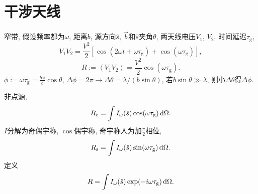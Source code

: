 \chapter{干涉天线}

窄带, 假设频率都为$\omega$, 距离$b$, 源方向$\hat{s}$, $\vec{b}$和$\hat{s}$夹角$\theta$, 两天线电压$V_1$, $V_2$, 时间延迟$\tau_\text{g}$,
\begin{equation}
    V_1V_2=\frac{V^2}{2}\left[\cos(2\omega t+\omega\tau_\text{g})+\cos(\omega\tau_\text{g})\right],
\end{equation}
\begin{equation}
    R:=\left\langle V_1V_2\right\rangle =\frac{V^2}{2}\cos(\omega\tau_\text{g}).
\end{equation}
$\phi:=\omega\tau_\text{g}=\frac{b\omega}{c}\cos\theta$, $\Delta\phi=2\pi\to\Delta\theta=\lambda/(b\sin\theta)$, 若$b\sin\theta\gg\lambda$, 则小$\Delta\theta$得$\Delta\phi$.

非点源,
\begin{equation}
    R_\text{c}=\int I_\omega(\hat{s})\cos(\omega\tau_\text{g})\,\mathrm{d}\Omega.
\end{equation}
$I$分解为奇偶宇称, $\cos$偶宇称, 奇宇称人为加$\frac{\pi}{2}$相位,
\begin{equation}
    R_\text{s}=\int I_\omega(\hat{s})\sin(\omega\tau_\text{g})\,\mathrm{d}\Omega.
\end{equation}
定义
\begin{equation}
    R=\int I_\omega(\hat{s})\exp(-i\omega\tau_\text{g})\,\mathrm{d}\Omega.
\end{equation}
